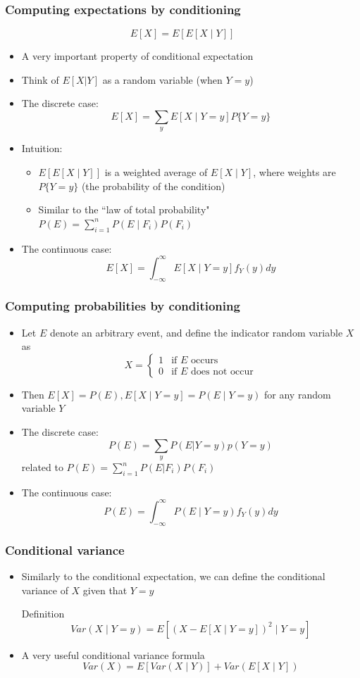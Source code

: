 \documentclass[slidestop,compress,mathserif]{beamer}
\begin{document}
\begin{frame}\frametitle{Computing expectations by conditioning}
$$E[X] = E[E[X\mid Y]]$$
\begin{itemize}
\item A very important property of conditional expectation
\item Think of $E[X|Y]$ as a random variable (when $Y = y$)
\item The discrete case:
$$E[X] = \sum_y E[X\mid Y = y]P\{Y = y\}$$
\item Intuition:
\begin{itemize}
\item $E[E[X\mid Y]]$ is a weighted average of $E[X\mid Y]$, where weights are $P\{Y = y\}$ (the probability of the condition)
\item Similar to the ``law of total probability" $P(E) = \sum_{i=1}^n P(E\mid F_i)P(F_i)$
\end{itemize}
\vspace{2mm}

\item The continuous case:
$$E[X] = \int_{-\infty}^{\infty}E[X\mid Y = y]f_Y(y)dy$$
\end{itemize}
\end{frame}


\begin{frame}\frametitle{Computing probabilities by conditioning}
\begin{itemize}
\item Let $E$ denote an arbitrary event, and define the indicator random variable $X$ as
\[ X = \begin{cases}
    1& \text{if $E$ occurs } \\
    0         & \text{if $E$ does not occur}
\end{cases}
 \]
\item Then $E[X] = P(E), E[X \mid Y = y] = P(E \mid Y = y)$ for any random variable $Y$
\vspace{2mm}
\item The discrete case:
$$P(E) = \sum_yP(E|Y = y)p(Y = y)$$
related to $P(E) = \sum_{i=1}^nP(E|F_i)P(F_i)$
\vspace{2mm}

\item The continuous case:
$$P(E) = \int_{-\infty}^{\infty}P(E \mid Y = y)f_Y(y)dy$$
\end{itemize}
\end{frame}

\begin{frame}\frametitle{Conditional variance}
\begin{itemize}
\item Similarly to the conditional expectation, we can define the conditional variance of $X$ given that $Y = y$
\begin{block}{Definition}
$$Var(X \mid Y = y) = E[(X - E[X \mid Y = y])^2  \mid  Y = y]$$
\end{block}
\item A very useful conditional variance formula
$$Var(X) = E[Var(X \mid Y)] + Var(E[X \mid Y])$$
\end{itemize}
\end{frame}
\end{document}
